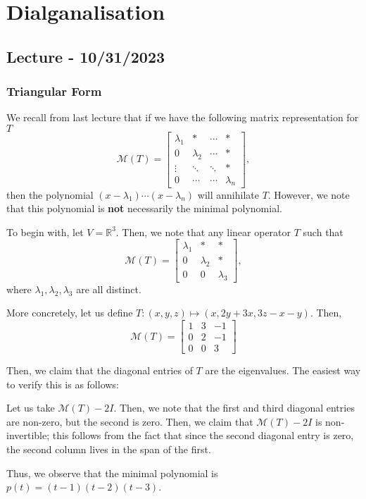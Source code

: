 \documentclass[openany]{book}
\newcommand{\RR}{\mathbb{R}}
\begin{document}
\chapter{Dialganalisation}
\section{Lecture - 10/31/2023}
\subsection{Triangular Form}
We recall from last lecture that if we have the following matrix representation for $T$
\begin{equation*}
	\mathcal M (T) = \begin{bmatrix}
		\lambda_{1} & * & \cdots & * \\
		0 & \lambda_2 & \cdots & * \\
		\vdots & \ddots & \ddots & * \\
		0 & \cdots & \cdots & \lambda_n
	\end{bmatrix},
\end{equation*}
then the polynomial $(x-\lambda_1)\cdots(x-\lambda_n)$ will annihilate $T$. However, we note that this polynomial is \textbf{not} necessarily the minimal polynomial.
\begin{example}
	To begin with, let $V = \RR^{3}$. Then, we note that any linear operator $T$ such that
	\begin{equation*}
		\mathcal M (T) =  
		\begin{bmatrix}
			\lambda_{1} & * & * \\ 0 & \lambda_{2} & * \\ 0 & 0 & \lambda_3
		\end{bmatrix},
	\end{equation*}
	where $\lambda_1,\lambda_2,\lambda_3$ are all distinct.
	
	More concretely, let us define $T : (x,y,z) \mapsto (x,2y+3x,3z-x-y)$. Then,
	\begin{equation*}
		\mathcal M(T) =
		\begin{bmatrix}
			1 & 3 & -1 \\ 0 & 2 & -1 \\ 0 & 0 & 3
		\end{bmatrix}
	\end{equation*}
	
	Then, we claim that the diagonal entries of $T$ are the eigenvalues. The easiest way to verify this is as follows:
	
	Let us take $\mathcal M (T) - 2I$. Then, we note that the first and third diagonal entries are non-zero, but the second is zero. Then, we claim that $\mathcal M(T) - 2I$ is non-invertible; this follows from the fact that since the second diagonal entry is zero, the second column lives in the span of the first.
	
	Thus, we observe that the minimal polynomial is $p(t) = (t - 1)(t-2)(t-3)$.
\end{example}
\end{document}
